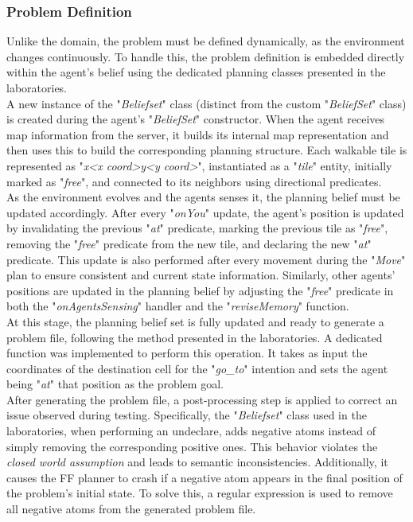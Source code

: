         \subsubsection{Problem Definition}
            Unlike the domain, the problem must be defined dynamically, as the environment changes continuously. To handle this, the problem definition is embedded directly within the agent's belief using the dedicated planning classes presented in the laboratories.
            \medskip\\
            A new instance of the "\textit{Beliefset}" class (distinct from the custom "\textit{BeliefSet}" class) is created during the agent's "\textit{BeliefSet}" constructor. When the agent receives map information from the server, it builds its internal map representation and then uses this to build the corresponding planning structure. Each walkable tile is represented as "\textit{x<x coord>y<y coord>}", instantiated as a "\textit{tile}" entity, initially marked as "\textit{free}", and connected to its neighbors using directional predicates.
            \medskip\\
            As the environment evolves and the agents senses it, the planning belief must be updated accordingly. After every "\textit{onYou}" update, the agent's position is updated by invalidating the previous "\textit{at}" predicate, marking the previous tile as "\textit{free}", removing the "\textit{free}" predicate from the new tile, and declaring the new "\textit{at}" predicate. This update is also performed after every movement during the "\textit{Move}" plan to ensure consistent and current state information. Similarly, other agents' positions are updated in the planning belief by adjusting the "\textit{free}" predicate in both the "\textit{onAgentsSensing}" handler and the "\textit{reviseMemory}" function.
            \medskip\\
            At this stage, the planning belief set is fully updated and ready to generate a problem file, following the method presented in the laboratories. A dedicated function was implemented to perform this operation. It takes as input the coordinates of the destination cell for the "\textit{go\_to}" intention and sets the agent being "\textit{at}" that position as the problem goal.
            \medskip\\
            After generating the problem file, a post-processing step is applied to correct an issue observed during testing. Specifically, the "\textit{Beliefset}" class used in the laboratories, when performing an undeclare, adds negative atoms instead of simply removing the corresponding positive ones. This behavior violates the \textit{closed world assumption} and leads to semantic inconsistencies. Additionally, it causes the FF planner to crash if a negative atom appears in the final position of the problem's initial state. To solve this, a regular expression is used to remove all negative atoms from the generated problem file.

